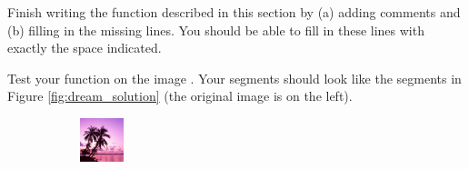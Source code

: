 \begin{problem} Finish writing the function  described in this section by (a) adding comments and (b) filling in the missing lines. 
You should be able to fill in these lines with exactly the space indicated.

Test your function on the image . Your segments should look like the segments in Figure \ref{fig:dream_solution} (the original image is on the left).
\end{problem}

\begin{figure}
\centering
    \centering
    \begin{subfigure}{0.31\textwidth}
        \includegraphics[width=\textwidth]{RegDream.png}
    \end{subfigure}
    \hspace*{\fill}
    \begin{subfigure}{0.31\textwidth}

\end{subfigure}
\end{figure}
